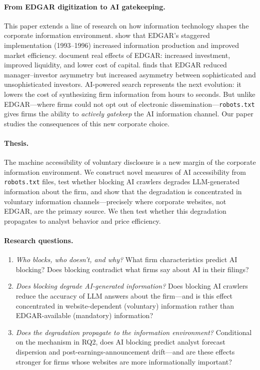 \documentclass[12pt,a4paper]{article}
\begin{document}
\paragraph{From EDGAR digitization to AI gatekeeping.} This paper extends a line of research on how information technology shapes the corporate information environment. \citet{GaoHuang2020} show that EDGAR's staggered implementation (1993--1996) increased information production and improved market efficiency. \citet{GoldsteinYangZuo2023} document real effects of EDGAR: increased investment, improved liquidity, and lower cost of capital. \citet{Gomez2024} finds that EDGAR reduced manager--investor asymmetry but increased asymmetry between sophisticated and unsophisticated investors. AI-powered search represents the next evolution: it lowers the cost of synthesizing firm information from hours to seconds. But unlike EDGAR---where firms could not opt out of electronic dissemination---\texttt{robots.txt} gives firms the ability to \emph{actively gatekeep} the AI information channel. Our paper studies the consequences of this new corporate choice.

\paragraph{Thesis.} The machine accessibility of voluntary disclosure is a new margin of the corporate information environment. We construct novel measures of AI accessibility from \texttt{robots.txt} files, test whether blocking AI crawlers degrades LLM-generated information about the firm, and show that the degradation is concentrated in voluntary information channels---precisely where corporate websites, not EDGAR, are the primary source. We then test whether this degradation propagates to analyst behavior and price efficiency.

\paragraph{Research questions.}
\begin{enumerate}[label=\textbf{RQ\arabic*:}]
    \item \textit{Who blocks, who doesn't, and why?} What firm characteristics predict AI blocking? Does blocking contradict what firms say about AI in their filings?
    \item \textit{Does blocking degrade AI-generated information?} Does blocking AI crawlers reduce the accuracy of LLM answers about the firm---and is this effect concentrated in website-dependent (voluntary) information rather than EDGAR-available (mandatory) information? \label{sec:rq2}
    \item \textit{Does the degradation propagate to the information environment?} Conditional on the mechanism in RQ2, does AI blocking predict analyst forecast dispersion and post-earnings-announcement drift---and are these effects stronger for firms whose websites are more informationally important?
\end{enumerate}
\end{document}
